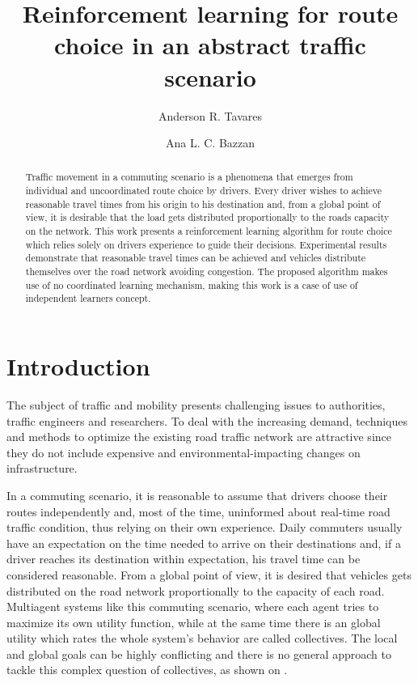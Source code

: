 \documentclass[12pt]{llncs}
\title{Reinforcement learning for route choice in an abstract traffic scenario}
\author{
  Anderson R. Tavares\inst{1} \and Ana L. C. Bazzan\inst{1}
}
\institute{Instituto de Inform\'atica -- Universidade Federal do Rio Grande do Sul
  (UFRGS)\\
  Caixa Postal 15.064 -- 91.501-970 -- Porto Alegre -- RS -- Brazil
  \email{\{artavares,bazzan\}@inf.ufrgs.br}
}
\begin{document}
\maketitle

\begin{abstract}
Traffic movement in a commuting scenario is a phenomena that emerges from individual and uncoordinated route choice by drivers. Every driver wishes to achieve reasonable travel times from his origin to his destination and, from a global point of view, it is desirable that the load gets distributed proportionally to the roads capacity on the network. This work presents a reinforcement learning algorithm for route choice which relies solely on drivers experience to guide their decisions. Experimental results demonstrate that reasonable travel times can be achieved and vehicles distribute themselves over the road network avoiding congestion. The proposed algorithm makes use of no coordinated learning mechanism, making this work is a case of use of independent learners concept.
\end{abstract}





\section{Introduction}
\label{sec:intro}

The subject of traffic and mobility presents challenging issues to authorities, traffic engineers and researchers. To deal with the increasing demand, techniques and methods to optimize the existing road traffic network are attractive since they do not include expensive and environmental-impacting changes on infrastructure.

In a commuting scenario, it is reasonable to assume that drivers choose their routes independently and, most of the time, uninformed about real-time road traffic condition, thus relying on their own experience. Daily commuters usually have an expectation on the time needed to arrive on their destinations and, if a driver reaches its destination within expectation, his travel time can be considered  reasonable. From a global point of view, it is desired that vehicles gets distributed on the road network proportionally to the capacity of each road. Multiagent systems like this commuting scenario, where each agent tries to maximize its own utility function, while at the same time there is an global utility which rates the whole system's behavior are called collectives. The local and global goals can be highly conflicting and there is no general approach to tackle this complex question of collectives, as shown on \cite{Tumer&Wolpert2004}.
\end{document}
